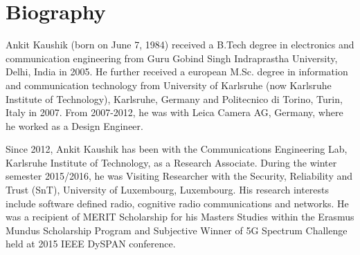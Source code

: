 \chapter*{Biography}


Ankit Kaushik (born on June 7, 1984) received a B.\;Tech degree in electronics and communication engineering from Guru Gobind Singh Indraprastha University, Delhi, India in 2005. He further received a european M.\;Sc. degree in information and communication technology from University of Karlsruhe (now Karlsruhe Institute of Technology), Karlsruhe, Germany and Politecnico di Torino, Turin, Italy in 2007. From 2007-2012, he was with Leica Camera AG, Germany, where he worked as a Design Engineer. 

Since 2012, Ankit Kaushik has been with the Communications Engineering Lab, Karlsruhe Institute of Technology, as a Research Associate. During the winter semester 2015/2016, he was Visiting Researcher with the Security, Reliability and Trust (SnT), University of Luxembourg, Luxembourg. His research interests include software defined radio, cognitive radio communications and networks. He was a recipient of MERIT Scholarship for his Masters Studies within the Erasmus Mundus Scholarship Program and Subjective Winner of 5G Spectrum Challenge held at 2015 IEEE DySPAN conference.

%
%
%	


